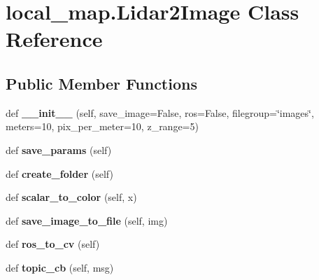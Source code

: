 \hypertarget{classlocal__map_1_1Lidar2Image}{}\section{local\+\_\+map.\+Lidar2\+Image Class Reference}
\label{classlocal__map_1_1Lidar2Image}
\subsection*{Public Member Functions}
\begin{DoxyCompactItemize}
\item 
\mbox{\label{classlocal__map_1_1Lidar2Image_acb71dbd9a375a08e4fd2cb3e23e74e40}} 
def {\bfseries \+\_\+\+\_\+init\+\_\+\+\_\+} (self, save\+\_\+image=False, ros=False, filegroup=\char`\"{}images\char`\"{}, meters=10, pix\+\_\+per\+\_\+meter=10, z\+\_\+range=5)
\item 
\mbox{\label{classlocal__map_1_1Lidar2Image_a4b43322b5773eed72eb04560bcb06a13}} 
def {\bfseries save\+\_\+params} (self)
\item 
\mbox{\label{classlocal__map_1_1Lidar2Image_a621cbeab37dca845ca78b608cf1a7659}} 
def {\bfseries create\+\_\+folder} (self)
\item 
\mbox{\label{classlocal__map_1_1Lidar2Image_ae62d46beabae118ecd043e23ae2b9ed9}} 
def {\bfseries scalar\+\_\+to\+\_\+color} (self, x)
\item 
\mbox{\label{classlocal__map_1_1Lidar2Image_a7b4db0940b12ac3f8b9fb431c0dc48c6}} 
def {\bfseries save\+\_\+image\+\_\+to\+\_\+file} (self, img)
\item 
\mbox{\label{classlocal__map_1_1Lidar2Image_afa3cb1aa3f8b9e23031aa508f85421fa}} 
def {\bfseries ros\+\_\+to\+\_\+cv} (self)
\item 
\mbox{\label{classlocal__map_1_1Lidar2Image_a6e526d6101fd18dd5ba666a837d85472}} 
def {\bfseries topic\+\_\+cb} (self, msg)
\item 
\mbox{\label{classlocal__map_1_1Lidar2Image_a8c85e9b7c7d13cfebb73c18bbaa41151}} 

\end{DoxyCompactItemize}
